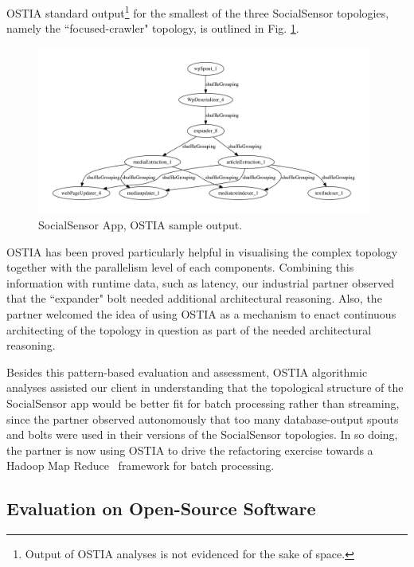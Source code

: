 OSTIA standard output\footnote{Output of OSTIA analyses is not evidenced for the
sake of space.} for the smallest of the three SocialSensor topologies, namely
the ``focused-crawler" topology, is outlined in Fig. \ref{topo1}.

\begin{figure}
\begin{center}
		\includegraphics[width=11cm]{images/output/focused_crawler}
		\caption{SocialSensor App, OSTIA sample output.}
		\label{topo1}
		\end{center}
\end{figure}

OSTIA has been proved particularly helpful in visualising the complex topology
together with the parallelism level of each components. Combining this
information with runtime data, such as latency, our industrial partner observed
that the ``expander" bolt needed additional architectural reasoning. Also, the
partner welcomed the idea of using OSTIA as a mechanism to enact continuous
architecting of the topology in question as part of the needed architectural
reasoning.

Besides this pattern-based evaluation and assessment, OSTIA algorithmic analyses
assisted our client in understanding that the topological structure of the
SocialSensor app would be better fit for batch processing rather than streaming,
since the partner observed autonomously that too many database-output spouts and
bolts were used in their versions of the SocialSensor topologies. In so doing,
the partner is now using OSTIA to drive the refactoring exercise towards a
Hadoop Map Reduce~\cite{hadoop}
framework for batch processing.

\subsection{Evaluation on Open-Source Software}\label{os}

